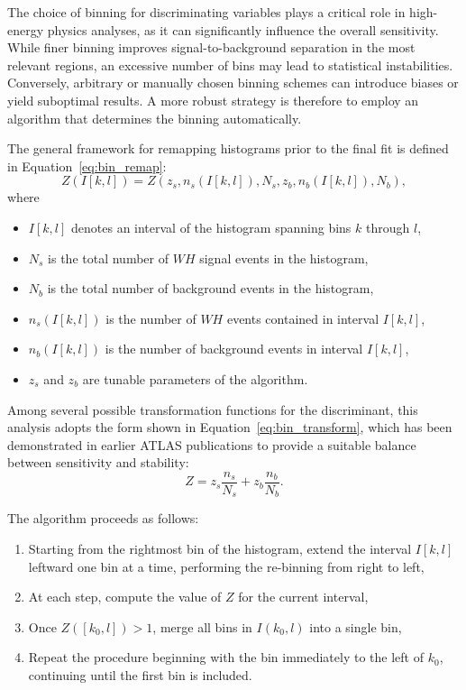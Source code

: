 The choice of binning for discriminating variables plays a critical role in high-energy physics analyses, as it can significantly influence the overall sensitivity. While finer binning improves signal-to-background separation in the most relevant regions, an excessive number of bins may lead to statistical instabilities. Conversely, arbitrary or manually chosen binning schemes can introduce biases or yield suboptimal results. A more robust strategy is therefore to employ an algorithm that determines the binning automatically.

The general framework for remapping histograms prior to the final fit is defined in Equation~\ref{eq:bin_remap}:
\begin{equation}\label{eq:bin_remap}
  Z(I[k, l]) = Z(z_{s}, n_{s}(I[k, l]), N_{s}, z_{b}, n_{b}(I[k, l]), N_{b}),
\end{equation}
where
\begin{itemize}
\item $I[k, l]$ denotes an interval of the histogram spanning bins $k$ through $l$,
\item $N_{s}$ is the total number of $WH$ signal events in the histogram,
\item $N_{b}$ is the total number of background events in the histogram,
\item $n_{s}(I[k, l])$ is the number of $WH$ events contained in interval $I[k, l]$,
\item $n_{b}(I[k, l])$ is the number of background events in interval $I[k, l]$,
\item $z_{s}$ and $z_{b}$ are tunable parameters of the algorithm.
\end{itemize}

Among several possible transformation functions for the discriminant, this analysis adopts the form shown in Equation~\ref{eq:bin_transform}, which has been demonstrated in earlier ATLAS publications to provide a suitable balance between sensitivity and stability:
\begin{equation}\label{eq:bin_transform}
  Z = z_{s} \frac{n_{s}}{N_{s}} + z_{b} \frac{n_{b}}{N_{b}}.
\end{equation}

The algorithm proceeds as follows:
\begin{enumerate}
\item Starting from the rightmost bin of the histogram, extend the interval $I[k, l]$ leftward one bin at a time, performing the re-binning from right to left,
\item At each step, compute the value of $Z$ for the current interval,
\item Once $Z([k_{0}, l]) > 1$, merge all bins in $I(k_{0}, l)$ into a single bin,
\item Repeat the procedure beginning with the bin immediately to the left of $k_{0}$, continuing until the first bin is included.
\end{enumerate}

